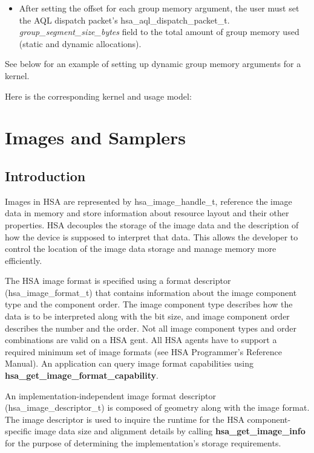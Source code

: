 \documentclass{book}
\newcommand{\reffun}[1]{\textbf{#1}}
\newcommand{\reffld}[1]{\textit{#1}}
\newcommand{\reftyp}[1]{#1}
\begin{document}
\begin{appendices}
\begin{itemize}
\item After setting the offset for each group memory argument, the
  user must set the AQL dispatch packet's
  \reftyp{hsa\_aql\_dispatch\_packet\_t}.\reffld{
    group\_segment\_size\_bytes} field to the total amount of group
  memory used (static and dynamic allocations).

\end{itemize}

See below for an example of setting up dynamic group memory
arguments for a kernel.


Here is the corresponding kernel and usage model:



\chapter{Images and Samplers}
\label{images} \hypertarget{images}{}
\hypertarget{Images}{\section{Introduction} \label{images}}

Images in HSA are represented by \reftyp{hsa\_image\_handle\_t}, reference the
image data in memory and store information about resource layout and
their other properties. HSA decouples the storage of the image data
and the description of how the device is supposed to interpret that
data. This allows the developer to control the location of the image
data storage and manage memory more efficiently.

The HSA image format is specified using a format descriptor
(\reftyp{hsa\_image\_format\_t}) that contains information about the image
component type and the component order. The image component type
describes how the data is to be interpreted along with the bit size,
and image component order describes the number and the order. Not all
image component types and order combinations are valid on a HSA
gent. All HSA agents have to support a required minimum set of image
formats (see HSA Programmer’s Reference Manual). An application can
query image format capabilities using
\reffun{hsa\_get\_image\_format\_capability}.

An implementation-independent image format descriptor
(\reftyp{hsa\_image\_descriptor\_t}) is composed of geometry along with the image
format. The image descriptor is used to inquire the runtime for the
HSA component-specific image data size and alignment details by
calling \reffun{hsa\_get\_image\_info} for the purpose of determining the
implementation’s storage requirements.


\end{appendices}
\end{document}

